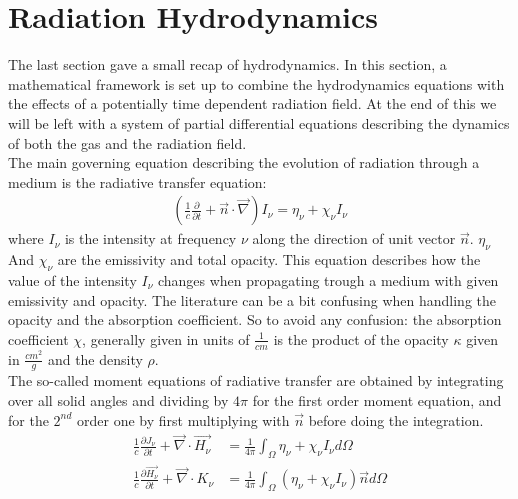 \section{Radiation Hydrodynamics}
The last section gave a small recap of hydrodynamics. In this section, a mathematical framework is set up to combine the hydrodynamics equations with the effects of a potentially time dependent radiation field. At the end of this we will be left with a system of partial differential equations describing the dynamics of both the gas and the radiation field.\\ 
The main governing equation describing the evolution of radiation through a medium is the radiative transfer equation:
\begin{align}
\left( \frac{1}{c} \frac{\partial}{\partial t} + \vec{n} \cdot \vec{\nabla} \right) I_\nu = \eta_\nu + \chi_\nu I_\nu \label{eq: RTE}
\end{align}
where $I_\nu$ is the intensity at frequency $\nu$ along the direction of unit vector $\vec{n}$. $\eta_\nu$ And $\chi_\nu$ are the emissivity and total opacity. This equation describes how the value of the intensity $I_\nu$ changes when propagating trough a medium with given emissivity and opacity. The literature can be a bit confusing when handling the opacity and the absorption coefficient. So to avoid any confusion: the absorption coefficient $\chi$, generally given in units of $\frac{1}{cm}$ is the product of the opacity $\kappa$ given in $\frac{cm^2}{g}$ and the density $\rho$.\\

The so-called moment equations of radiative transfer are obtained by integrating over all solid angles and dividing by $4 \pi$ for the first order moment equation, and for the $2^{nd}$ order one by first multiplying with $\vec{n}$ before doing the integration.\\

\begin{align}
\frac{1}{c} \frac{\partial J_\nu}{\partial t} + \vec{\nabla} \cdot \vec{H_\nu} &= \frac{1}{4 \pi} \int_\Omega \eta_\nu + \chi_\nu I_\nu d\Omega \\
\frac{1}{c} \frac{\partial \vec{H_\nu}}{\partial t} + \vec{\nabla} \cdot K_\nu &= \frac{1}{4 \pi} \int_\Omega \left( \eta_\nu + \chi_\nu I_\nu\right) \vec{n} d\Omega
\end{align}

